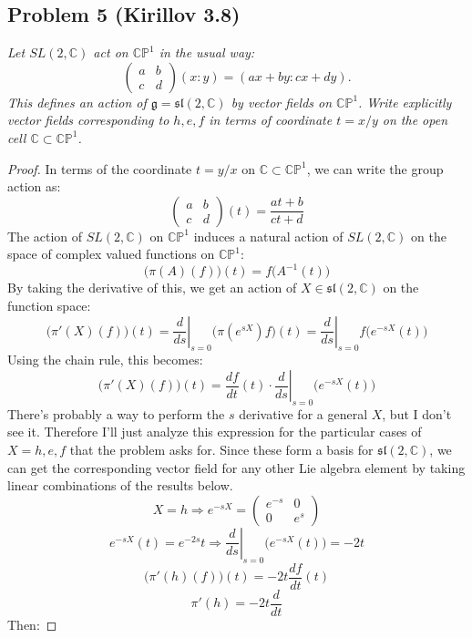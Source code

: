 \documentclass[12 pt]{article}
\newcommand{\C}{\mathbb{C}}
\newcommand{\fr}{\mathfrak}
\begin{document}
\subsection*{Problem 5 (Kirillov 3.8)}
\emph{Let $SL(2,\C)$ act on $\mathbb{CP}^1$ in the usual way:
\[   \left( \begin{array} {cc} a&b \\  c& d  \end{array} \right)  (x : y) = (ax +by : cx +dy).          \]
This defines an action of $\fr{g} = \fr{sl}(2,\C)$ by vector fields on $\mathbb{CP}^1$. Write explicitly vector fields corresponding to $h, e, f$ in terms of coordinate $t = x/y$ on the open cell $\C \subset \mathbb{CP}^1$.}

\begin{proof}
In terms of the coordinate $t = y/x$ on $\C\subset \mathbb{CP}^1$, we can write the group action as:
\[      \left( \begin{array} {cc} a&b \\  c& d  \end{array} \right) (t) = \frac{at+b}{ct+d}    \]
The action of $SL(2,\C)$ on $\mathbb{CP}^1$ induces a natural action of $SL(2,\C)$ on the space of complex valued functions on $\mathbb{CP}^1$:
\[       \big( \pi(A) (f)\big) (t) = f \big( A^{-1} (t) \big)    \]
By taking the derivative of this, we get an action of $X \in \fr{sl}(2,\C)$ on the function space:
\[   \big(  \pi'(X) (f) \big) (t)  = \left. \frac{d}{ds}\right|_{s=0} \big( \pi(e^{sX}) f \big) (t) =  \left. \frac{d}{ds}\right|_{s=0} f \big( e^{-sX} (t) \big)  \]
Using the chain rule, this becomes:
\[      \big(  \pi'(X) (f) \big) (t) = \frac{df}{dt}(t) \cdot  \left. \frac{d}{ds}\right|_{s=0} \big( e^{-sX} (t) \big)     \]
There's probably a way to perform the $s$ derivative for a general $X$, but I don't see it. Therefore I'll just analyze this expression for the particular cases of $X = h,e,f$ that the problem asks for. Since these form a basis for $\fr{sl}(2,\C)$, we can get the corresponding vector field for any other Lie algebra element by taking linear combinations of the results below.
\[    X = h \Rightarrow e^{-sX} =    \left( \begin{array} {cc} e^{-s} & 0 \\  0 & e^{s}  \end{array} \right)   \]
\[      e^{-sX} (t) = e^{-2s} t  \Rightarrow \left. \frac{d}{ds}\right|_{s=0} \big( e^{-sX} (t) \big) = -2t  \]
\[     \big(  \pi'(h) (f) \big) (t) = -2t \frac{df}{dt} (t)    \]
\[      \pi'(h) = -2t \frac{d}{dt}    \]
Then:

\end{proof}
\end{document}
